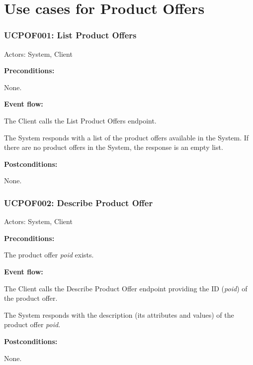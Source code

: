 \section{Use cases for Product Offers}

\begin{ucbox}{\subsubsection{UCPOF001: List Product Offers}}
\label{UCPOF001}

Actors: System, Client

\textbf{Preconditions:}

\ucitem None.

\textbf{Event flow:}

\ucitem The Client calls the List Product Offers endpoint.

\ucitem The System responds with a list of the product offers available in the System. If there are no product offers in the System, the response is an empty list.

\textbf{Postconditions:}

\ucitem None.

\end{ucbox}

\begin{ucbox}{\subsubsection{UCPOF002: Describe Product Offer}}
\label{UCPOF002}

Actors: System, Client

\textbf{Preconditions:} 

\ucitem The product offer \textit{poid} exists.

\textbf{Event flow:}

\ucitem The Client calls the Describe Product Offer endpoint providing the ID (\textit{poid}) of the product offer.

\ucitem The System responds with the description (its attributes and values) of the product offer \textit{poid}.

\textbf{Postconditions:}

\ucitem None.

\end{ucbox}

